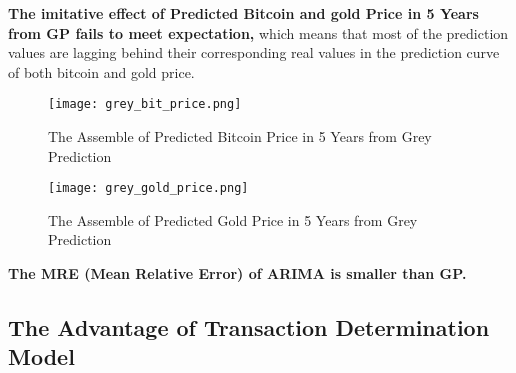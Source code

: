 \documentclass{mcmthesis}
\begin{document}
\begin{enumerate}
\item \textbf{The imitative effect of Predicted Bitcoin and gold Price in 5 Years from GP fails to meet expectation,} which means that most of the prediction values are lagging behind their corresponding real values in the prediction curve of both bitcoin and gold price.

\begin {figure} [htbp]
\centering
\texttt{[image: grey\_bit\_price.png]}
\caption{The Assemble of Predicted Bitcoin Price in 5 Years from Grey Prediction}
\end {figure}

\begin {figure} [htbp]
\centering
\texttt{[image: grey\_gold\_price.png]}
\caption{The Assemble of Predicted Gold Price in 5 Years from Grey Prediction}
\end {figure}

\item \textbf{The MRE (Mean Relative Error) of ARIMA is smaller than GP.}

\begin{figure}[htbp]    %
  \centering            %
  \caption{}    %
  \label{}            %

\item 
\end{figure}


\end{enumerate}

\subsection{The Advantage of Transaction Determination Model}
\end{document}
